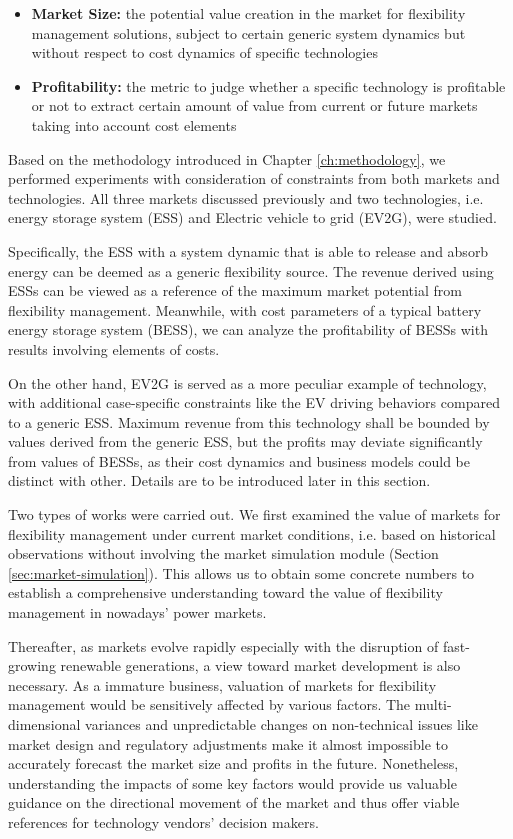 \begin{itemize}
	\item \textbf{Market Size:} the potential value creation in the market for flexibility management solutions, subject to certain generic system dynamics but without respect to cost dynamics of specific technologies
	\item \textbf{Profitability:} the metric to judge whether a specific technology is profitable or not to extract certain amount of value from current or future markets taking into account cost elements
\end{itemize}

Based on the methodology introduced in Chapter \ref{ch:methodology}, we performed experiments with consideration of constraints from both markets and technologies. All three markets discussed previously and two technologies, i.e. energy storage system (ESS) and Electric vehicle to grid (EV2G), were studied. 

Specifically, the ESS with a system dynamic that is able to release and absorb energy can be deemed as a generic flexibility source. The revenue derived using ESSs can be viewed as a reference of the maximum market potential from flexibility management. Meanwhile, with cost parameters of a typical battery energy storage system (BESS), we can analyze the profitability of BESSs with results involving elements of costs. 

On the other hand, EV2G is served as a more peculiar example of technology, with additional case-specific constraints like the EV driving behaviors compared to a generic ESS. Maximum revenue from this technology shall be bounded by values derived from the generic ESS, but the profits may deviate significantly from values of BESSs, as their cost dynamics and business models could be distinct with other. Details are to be introduced later in this section.

Two types of works were carried out. We first examined the value of markets for flexibility management under current market conditions, i.e. based on historical observations without involving the market simulation module (Section \ref{sec:market-simulation}). This allows us to obtain some concrete numbers to establish a comprehensive understanding toward the value of flexibility management in nowadays' power markets. 

Thereafter, as markets evolve rapidly especially with the disruption of fast-growing renewable generations, a view toward market development is also necessary. As a immature business, valuation of markets for flexibility management would be sensitively affected by various factors. The multi-dimensional variances and unpredictable changes on non-technical issues like market design and regulatory adjustments make it almost impossible to accurately forecast the market size and profits in the future. Nonetheless, understanding the impacts of some key factors would provide us valuable guidance on the directional movement of the market and thus offer viable references for technology vendors' decision makers.


